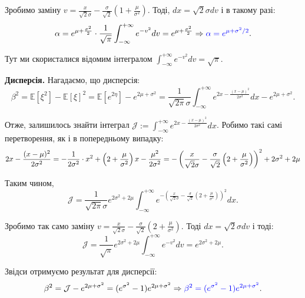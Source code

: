 \documentclass{hw_template}
\begin{document}
Зробимо заміну
$v=\frac{x}{\sqrt{2}\sigma}-\frac{\sigma}{\sqrt{2}}\left(1+\frac{\mu}{\sigma^2}\right)$. Тоді, 
$dx=\sqrt{2}\sigma dv$ і в такому разі:
\begin{equation*}
     \alpha = e^{\mu+\frac{\sigma^2}{2}} \cdot \frac{1}{\sqrt{\pi}}\int_{-\infty}^{+\infty}e^{-v^2}dv = e^{\mu+\frac{\sigma^2}{2}} \Rightarrow \textcolor{blue}{\alpha = e^{\mu+\sigma^2/2}}.
\end{equation*}

Тут ми скористалися відомим інтегралом $\int_{-\infty}^{+\infty}e^{-v^2}dv=\sqrt{\pi}$.

\textcolor{green!50!black}{\textbf{Дисперсія.}} Нагадаємо, що дисперсія:
\begin{equation*}
    \beta^2 = \mathbb{E}[\xi^2] - \mathbb{E}[\xi]^2 = \mathbb{E}[e^{2\eta}] - e^{2\mu+\sigma^2} = \frac{1}{\sqrt{2\pi}\sigma}\int_{-\infty}^{+\infty} e^{2x-\frac{(x-\mu)^2}{2\sigma^2}}dx - e^{2\mu+\sigma^2}.
\end{equation*}

Отже, залишилось знайти інтеграл $\mathcal{J} := \int_{-\infty}^{+\infty}
e^{2x-\frac{(x-\mu)^2}{2\sigma^2}}dx$. Робимо такі самі перетворення, як і 
в попередньому випадку:
\begin{equation*}
    \small 2x-\frac{(x-\mu)^2}{2\sigma^2} = -\frac{1}{2\sigma^2}\cdot x^2 + \left(2+\frac{\mu}{\sigma^2}\right)x - \frac{\mu^2}{2\sigma^2} = -\left(\frac{x}{\sqrt{2}\sigma}-\frac{\sigma}{\sqrt{2}}\left(2+\frac{\mu}{\sigma^2}\right)\right)^2 + 2\sigma^2 + 2\mu
\end{equation*}

Таким чином,
\begin{equation*}
    \mathcal{J} = \frac{1}{\sqrt{2\pi}\sigma}e^{2\sigma^2+2\mu}\int_{-\infty}^{+\infty}e^{-\left(\frac{x}{\sqrt{2}\sigma}-\frac{\sigma}{\sqrt{2}}\left(2+\frac{\mu}{\sigma^2}\right)\right)^2}dx.
\end{equation*}

Зробимо так само заміну $v =
\frac{x}{\sqrt{2}\sigma}-\frac{\sigma}{\sqrt{2}}\left(2+\frac{\mu}{\sigma^2}\right)$.
Тоді $dx=\sqrt{2}\sigma dv$ і тоді:
\begin{equation*}
    \mathcal{J} = \frac{1}{\sqrt{\pi}}e^{2\sigma^2+2\mu}\int_{-\infty}^{+\infty}e^{-v^2}dv = e^{2\sigma^2+2\mu}.
\end{equation*}

Звідси отримуємо результат для дисперсії:
\begin{equation*}
    \beta^2 = \mathcal{J} - e^{2\mu+\sigma^2} = (e^{\sigma^2}-1)e^{2\mu+\sigma^2} \Rightarrow \textcolor{blue}{\beta^2 = (e^{\sigma^2}-1)e^{2\mu+\sigma^2}}.
\end{equation*}
\end{document}
